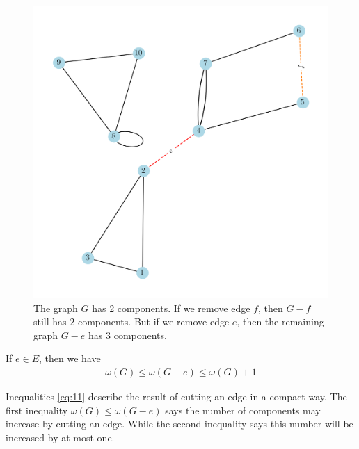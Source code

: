 \documentclass[thmcnt=section, 12pt, color=cyan]{my-elegantbook}
\begin{document}
\begin{figure}[ht]
    \centering
    \includegraphics[scale=0.5]{figures/g-005.png}
    \caption{
		The graph $G$ has 2 components.
		If we remove edge $f$, 
		then $G-f$ still has 2 components.
		But if we remove edge $e$, then 
		the remaining graph $G-e$ has 3 components.
	}
    \label{fig:5}
\end{figure}

\begin{proposition}\label{pro:6}
    If $e \in E$, then we have 
	\begin{align}
		\omega(G) \leq \omega(G-e)
		\leq \omega(G) + 1 
		\label{eq:11}
	\end{align}
\end{proposition}

Inequalities \eqref{eq:11} describe the result 
of cutting an edge in a compact way.
The first inequality $\omega(G) \leq \omega(G-e)$
says the number of components may increase by cutting an edge.
While the second inequality says this number will be increased 
by at most one.
\end{document}
